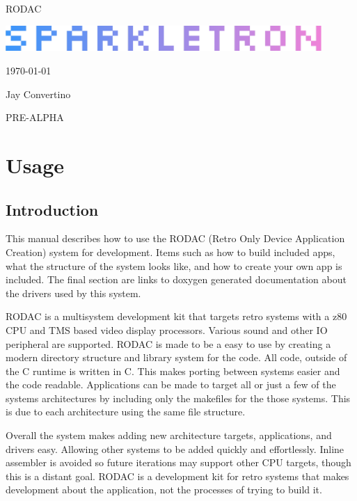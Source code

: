 \documentclass{article}
\begin{document}
  \begin{titlepage}
    \begin{center}

    {\Huge RODAC}

    \vspace{25mm}

    \includegraphics[width=0.90\textwidth,height=\textheight,keepaspectratio]{src/img/SPARKLETRON.png}

    \vspace{25mm}

    \today

    \vspace{15mm}

    {\Large Jay Convertino}

    \vspace{25mm}
    {\Huge PRE-ALPHA}

    \end{center}
  \end{titlepage}

  \tableofcontents

  \newpage

  \section{Usage}

  \subsection{Introduction}

  \par
  This manual describes how to use the RODAC (Retro Only Device Application Creation) system for development.
  Items such as how to build included apps, what the structure of the system looks like, and how to create your
  own app is included. The final section are links to doxygen generated documentation about the drivers used
  by this system.
  \par
  RODAC is a multisystem development kit that targets retro systems with a z80 CPU and TMS based video display
  processors. Various sound and other IO peripheral are supported. RODAC is made to be a easy to use by creating
  a modern directory structure and library system for the code. All code, outside of the C runtime is written
  in C. This makes porting between systems easier and the code readable. Applications can be made to target
  all or just a few of the systems architectures by including only the makefiles for the those systems. This is due to each
  architecture using the same file structure.
  \par
  Overall the system makes adding new architecture targets, applications, and drivers easy. Allowing other systems
  to be added quickly and effortlessly. Inline assembler is avoided so future iterations may support other CPU targets,
  though this is a distant goal. RODAC is a development kit for retro systems that makes development about the
  application, not the processes of trying to build it.
\end{document}
